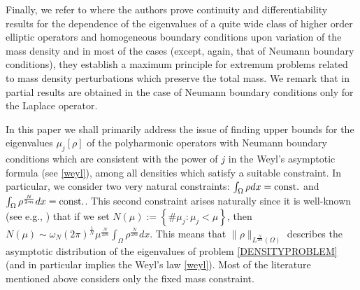\documentclass[11pt,a4paper]{amsart}
\numberwithin{equation}{section}
\begin{document}
Finally, we refer to \cite{laproeurasian} where the authors prove continuity and differentiability results for the dependence of the eigenvalues of a quite wide class of higher order elliptic operators and homogeneous boundary conditions upon variation of the mass density and in most of the cases (except, again, that of Neumann boundary conditions), they establish a maximum principle for extremum problems related to mass density perturbations which preserve the total mass. We remark that in \cite{laproeurasian} partial results are obtained in the case of Neumann boundary conditions only for the Laplace operator.

In this paper we shall primarily address the issue of finding upper bounds for the eigenvalues $\mu_j[\rho]$ of the polyharmonic operators with Neumann boundary conditions which are consistent with the power of $j$ in the Weyl's asymptotic formula (see \eqref{weyl}), among all densities which satisfy a suitable constraint. In particular, we consider two very natural constraints: $\int_{\Omega}\rho dx={\rm const.}$ and $\int_{\Omega}\rho^{\frac{N}{2m}}dx={\rm const.}$. This second constraint arises naturally since it is well-known (see e.g., \cite{lapidus}) that if we set $N(\mu):=\left\{\#\mu_j:\mu_j<\mu\right\}$, then $N(\mu)\sim\omega_N(2\pi)^{\frac{1}{N}}\mu^{\frac{N}{2m}}\int_{\Omega}\rho^{\frac{N}{2m}}dx$. This means that $\|\rho\|_{L^{\frac{N}{2m}}(\Omega)}$ describes the asymptotic distribution of the eigenvalues of problem \eqref{DENSITYPROBLEM} (and in particular implies the Weyl's law \eqref{weyl}). Most of the literature mentioned above considers only the fixed mass constraint. 
\end{document}
